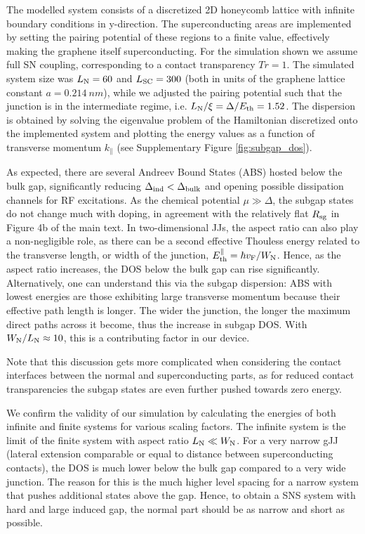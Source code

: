 \documentclass[preprint,
  onecolumn,
  notitlepage,
  amsmath,amssymb,
  aip,
  apl,
]{revtex4-1}
\begin{document}
The modelled system consists of a discretized 2D honeycomb lattice with infinite boundary conditions in y-direction.
The superconducting areas are implemented by setting the pairing potential of these regions to a finite value, effectively making the graphene itself superconducting.
For the simulation shown we assume full SN coupling, corresponding to a contact transparency $Tr=1$.
The simulated system size was $L_{\rm N}=60$ and $L_{\rm SC}=300$ (both in units of the graphene lattice constant $a=\SI{0.214}{nm}$), while we adjusted the pairing potential such that the junction is in the intermediate regime, i.e. $L_{\rm N}/\xi=\Delta/E_{\rm th} = 1.52$.
The dispersion is obtained by solving the eigenvalue problem of the Hamiltonian discretized onto the implemented system and plotting the energy values as a function of transverse momentum $k_\parallel$ (see Supplementary Figure \ref{fig:subgap_dos}).

As expected, there are several Andreev Bound States (ABS) hosted below the bulk gap, significantly reducing $\Delta_{\rm ind}<\Delta_{\rm bulk}$ and opening possible dissipation channels for RF excitations.
As the chemical potential $\mu\gg\Delta$, the subgap states do not change much with doping, in agreement with the relatively flat $R_{\rm sg}$ in Figure 4b of the main text.
In two-dimensional JJs, the aspect ratio can also play a non-negligible role, as there can be a second effective Thouless energy related to the transverse length, or width of the junction, $E_{\rm th}^\parallel=\hbar v_{\rm F}/W_{\rm N}$.
Hence, as the aspect ratio increases, the DOS below the bulk gap can rise significantly.
Alternatively, one can understand this via the subgap dispersion:
ABS with lowest energies are those exhibiting large transverse momentum because their effective path length is longer.
The wider the junction, the longer the maximum direct paths across it become, thus the increase in subgap DOS.
With $W_{\rm N}/L_{\rm N}\approx10$, this is a contributing factor in our device.

Note that this discussion gets more complicated when considering the contact interfaces between the normal and superconducting parts, as for reduced contact transparencies the subgap states are even further pushed towards zero energy.

We confirm the validity of our simulation by calculating the energies of both infinite and finite systems for various scaling factors.
The infinite system is the limit of the finite system with aspect ratio $L_{\rm N} \ll W_{\rm N}$.
For a very narrow gJJ (lateral extension comparable or equal to distance between superconducting contacts), the DOS is much lower below the bulk gap compared to a very wide junction.
The reason for this is the much higher level spacing for a narrow system that pushes additional states above the gap.
Hence, to obtain a SNS system with hard and large induced gap, the normal part should be as narrow and short as possible.
\end{document}
